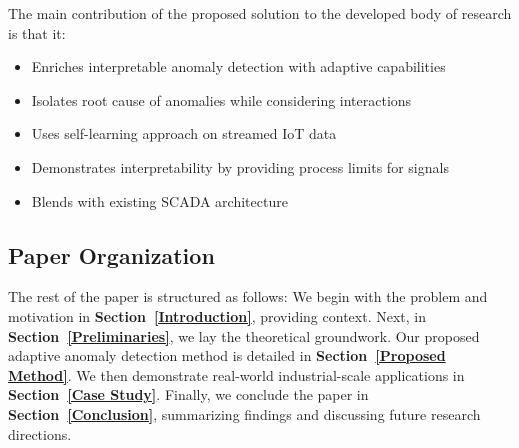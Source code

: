 The main contribution of the proposed solution to the developed body of research is that it:
\begin{itemize}
\item Enriches interpretable anomaly detection with adaptive capabilities
\item Isolates root cause of anomalies while considering interactions
\item Uses self-learning approach on streamed IoT data
\item Demonstrates interpretability by providing process limits for signals
\item Blends with existing SCADA architecture
\end{itemize}

\subsection{Paper Organization}
The rest of the paper is structured as follows: We begin with the problem and motivation in \textbf{Section~\ref{Introduction}}, providing context. Next, in \textbf{Section~\ref{Preliminaries}}, we lay the theoretical groundwork. Our proposed adaptive anomaly detection method is detailed in \textbf{Section~\ref{Proposed Method}}. We then demonstrate real-world industrial-scale applications in \textbf{Section~\ref{Case Study}}. Finally, we conclude the paper in \textbf{Section~\ref{Conclusion}}, summarizing findings and discussing future research directions.
